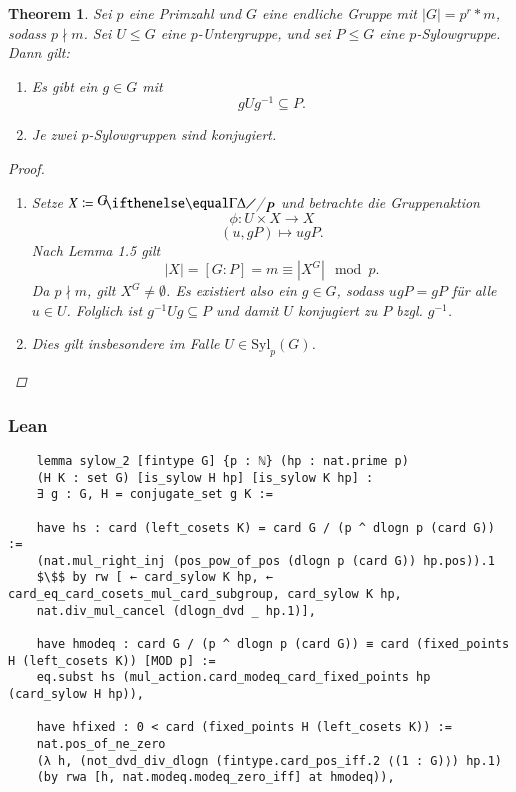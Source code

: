 \documentclass[a4paper,12pt]{scrartcl}
\newtheorem{Theorem}{Theorem}[section]
\begin{document}
\begin{Theorem}
    Sei $p$ eine Primzahl und $G$ eine endliche Gruppe mit $|G|=p^{r}*m$, sodass $p\nmid m$. Sei $U \leq G$ eine $p$-Untergruppe, und sei $P \leq G$ eine $p$-Sylowgruppe. Dann gilt:
    \begin{enumerate}
        \item Es gibt ein $g\in G$ mit $$gUg^{-1}\subseteq P.$$
        \item Je zwei $p$-Sylowgruppen sind konjugiert.
    \end{enumerate}
\begin{proof}
    \begin{enumerate}
        \item Setze $X\coloneqq\fkr{G}{P}$ und betrachte die Gruppenaktion
                    $$\phi:U\times X\to X$$
                    $$(u,gP)\mapsto ugP.$$
                    Nach Lemma 1.5 gilt $$|X|=[G : P]=m\equiv |X^{G}| \mod p.$$
                    Da $p\nmid m$, gilt $X^{G}\neq\emptyset$. Es existiert also ein $g\in G$, sodass $ugP=gP$ für alle $u\in U$.
                    Folglich ist $g^{-1}Ug\subseteq P$ und damit $U$ konjugiert zu $P$ bzgl. $g^{-1}$.
        \item Dies gilt insbesondere im Falle $U\in \text{Syl}_{p}(G)$.
    \end{enumerate}
\end{proof}
\end{Theorem}

\subsubsection{Lean}

\lstset{language=lean}

\begin{lstlisting}
	lemma sylow_2 [fintype G] {p : ℕ} (hp : nat.prime p)
	(H K : set G) [is_sylow H hp] [is_sylow K hp] :
	∃ g : G, H = conjugate_set g K :=
	
	have hs : card (left_cosets K) = card G / (p ^ dlogn p (card G)) := 
	(nat.mul_right_inj (pos_pow_of_pos (dlogn p (card G)) hp.pos)).1
	$\$$ by rw [ ← card_sylow K hp, ← card_eq_card_cosets_mul_card_subgroup, card_sylow K hp, 
	nat.div_mul_cancel (dlogn_dvd _ hp.1)],
	
	have hmodeq : card G / (p ^ dlogn p (card G)) ≡ card (fixed_points H (left_cosets K)) [MOD p] := 
	eq.subst hs (mul_action.card_modeq_card_fixed_points hp (card_sylow H hp)),
	
	have hfixed : 0 < card (fixed_points H (left_cosets K)) := 
	nat.pos_of_ne_zero 
	(λ h, (not_dvd_div_dlogn (fintype.card_pos_iff.2 ⟨(1 : G)⟩) hp.1) 
	(by rwa [h, nat.modeq.modeq_zero_iff] at hmodeq)),
\end{lstlisting}
\end{document}

